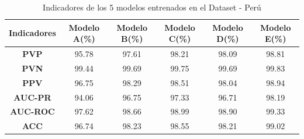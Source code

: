 		\begin{table}[H]
			\begin{center}
			\caption{\small{Indicadores de los 5 modelos entrenados en el Dataset - Perú}}
			\vspace{1.1em}
			\begin{tabular}{|c|c|c|c|c|c|}
			\cline{1-6}
			 \textbf{Indicadores}    & \textbf{Modelo A(\%)} & \textbf{Modelo B(\%)} & \textbf{Modelo C(\%)} &\textbf{ Modelo D(\%)} & \textbf{Modelo E(\%)} \\ \hline
			\multicolumn{1}{|c|}{\textbf{PVP}}        & 95.78     & 97.61       & 98.21       & 98.09       & 98.81       \\ \hline
			\multicolumn{1}{|c|}{\textbf{PVN}}        & 99.44     & 99.69       & 99.75       & 99.69       & 99.83       \\ \hline
			\multicolumn{1}{|c|}{\textbf{PPV}}        & 96.75     & 98.29       & 98.51       & 98.04       & 98.94       \\ \hline
			\multicolumn{1}{|c|}{\textbf{AUC-PR}}     & 94.06     & 96.75       & 97.33       & 96.71       & 98.19       \\ \hline
			\multicolumn{1}{|c|}{\textbf{AUC-ROC}}    & 97.62     & 98.66       & 98.99       & 98.90       & 99.33       \\ \hline
			\multicolumn{1}{|c|}{\textbf{ACC}}        & 96.74     & 98.23       & 98.55       & 98.21       & 99.02       \\ \hline
			\end{tabular}
			\end{center}
		\end{table}
